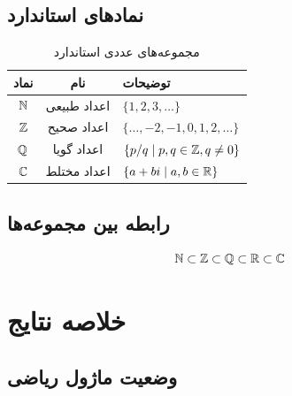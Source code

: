 \documentclass{matinbook}
\begin{document}
    \section{نمادهای استاندارد}
    
    \begin{table}[h]
        \centering
        \caption{مجموعه‌های عددی استاندارد}
        \label{tab:number-sets}
        \begin{tabular}{|c|c|C{7cm}|}
            \hline
            \textbf{نماد} & \textbf{نام} & \textbf{توضیحات} \\
            \hline
            $\mathbb{N}$ & اعداد طبیعی & $\{1, 2, 3, \ldots\}$ \\
            $\mathbb{Z}$ & اعداد صحیح & $\{\ldots, -2, -1, 0, 1, 2, \ldots\}$ \\
            $\mathbb{Q}$ & اعداد گویا & $\{p/q \mid p,q \in \mathbb{Z}, q \neq 0\}$ \\
            $\mathbb{C}$ & اعداد مختلط & $\{a + bi \mid a,b \in \mathbb{R}\}$ \\    
            \hline
        \end{tabular}
    \end{table}
    
    \section{رابطه بین مجموعه‌ها}
    
    \[
    \mathbb{N} \subset \mathbb{Z} \subset \mathbb{Q} \subset \mathbb{R} \subset \mathbb{C}
    \]
    
    \chapter{خلاصه نتایج}
    
    \section{وضعیت ماژول ریاضی}
    
\end{document}
